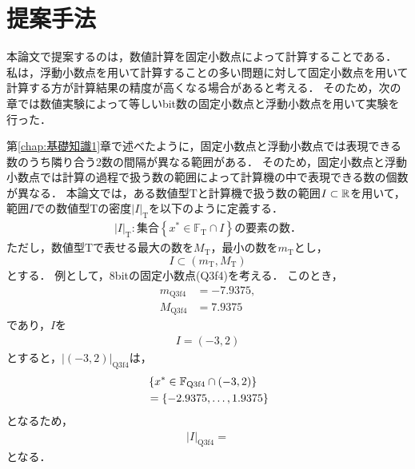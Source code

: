 \chapter{提案手法}
\label{chap:提案手法}
本論文で提案するのは，数値計算を固定小数点によって計算することである．
私は，浮動小数点を用いて計算することの多い問題に対して固定小数点を用いて計算する方が計算結果の精度が高くなる場合があると考える．
そのため，次の章では数値実験によって等しいbit数の固定小数点と浮動小数点を用いて実験を行った．


第\ref{chap:基礎知識1}章で述べたように，固定小数点と浮動小数点では表現できる数のうち隣り合う2数の間隔が異なる範囲がある．
そのため，固定小数点と浮動小数点では計算の過程で扱う数の範囲によって計算機の中で表現できる数の個数が異なる． %
本論文では，ある数値型$\mathrm{T}$と計算機で扱う数の範囲$I \subset \mathbb{R}$を用いて，範囲$I$での数値型$\mathrm{T}$の密度${|I|}_{\mathrm{T}}$を以下のように定義する．
\begin{align}
    \label{eq:def_density}
    {|I|}_{\mathrm{T}}: \text{集合}\left\{x^{\ast} \in \mathbb{F}_{\mathrm{T}} \cap I \right\}\text{の要素の数．}
\end{align}
ただし，数値型$\mathrm{T}$で表せる最大の数を$M_{\mathrm{T}}$，最小の数を$m_{\mathrm{T}}$とし，
\begin{equation}
    I \subset (m_{\mathrm{T}}, M_{\mathrm{T}})
\end{equation}
とする．
例として，8bitの固定小数点(Q3f4)を考える．
このとき，
\begin{align}
    m_{\mathrm{Q}3\mathrm{f}4} &= -7.9375, \\
    M_{\mathrm{Q}3\mathrm{f}4} &= 7.9375
\end{align}
であり，$I$を
\begin{eqnarray}
    I = \left(-3,2\right)
\end{eqnarray}
とすると，${|\left(-3,2\right)|}_{\mathrm{Q}3\mathrm{f}4}$は，
\begin{align}
    &\left\{x^{\ast}\in \mathbb{F}_{\text{Q}{3}\text{f}{4}} \cap (-3,2)\right\} \\
    &= \left\{-2.9375,\dots,1.9375\right\}
\end{align}
となるため，
\begin{align}
    {|I|}_{\mathrm{Q}3\mathrm{f}4} = 
\end{align}
となる．
